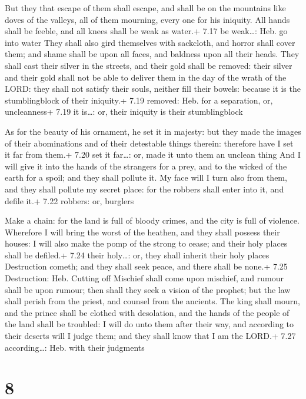  But they that escape of them shall escape, and shall be
on the mountains like doves of the valleys, all of them mourning, every
one for his iniquity.  All hands shall be feeble, and all
knees shall be weak as water.+ 7.17 be weak\ldots: Heb. go into water
 They shall also gird themselves with sackcloth, and horror
shall cover them; and shame shall be upon all faces, and baldness upon
all their heads.  They shall cast their silver in the
streets, and their gold shall be removed: their silver and their gold
shall not be able to deliver them in the day of the wrath of the LORD:
they shall not satisfy their souls, neither fill their bowels: because
it is the stumblingblock of their iniquity.+ 7.19 removed: Heb. for a
separation, or, uncleanness+ 7.19 it is\ldots: or, their iniquity is
their stumblingblock

 As for the beauty of his ornament, he set it in majesty:
but they made the images of their abominations and of their detestable
things therein: therefore have I set it far from them.+ 7.20 set it
far\ldots: or, made it unto them an unclean thing  And I
will give it into the hands of the strangers for a prey, and to the
wicked of the earth for a spoil; and they shall pollute it.
 My face will I turn also from them, and they shall pollute
my secret place: for the robbers shall enter into it, and defile it.+
7.22 robbers: or, burglers

 Make a chain: for the land is full of bloody crimes, and
the city is full of violence.  Wherefore I will bring the
worst of the heathen, and they shall possess their houses: I will also
make the pomp of the strong to cease; and their holy places shall be
defiled.+ 7.24 their holy\ldots: or, they shall inherit their holy
places  Destruction cometh; and they shall seek peace, and
there shall be none.+ 7.25 Destruction: Heb. Cutting off 
Mischief shall come upon mischief, and rumour shall be upon rumour; then
shall they seek a vision of the prophet; but the law shall perish from
the priest, and counsel from the ancients.  The king shall
mourn, and the prince shall be clothed with desolation, and the hands of
the people of the land shall be troubled: I will do unto them after
their way, and according to their deserts will I judge them; and they
shall know that I am the LORD.+ 7.27 according\ldots: Heb. with their
judgments

\hypertarget{section-7}{%
\section{8}\label{section-7}}

